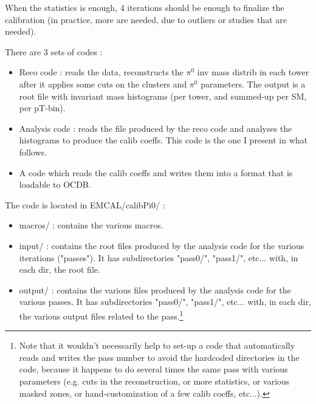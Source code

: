 When the statistics is enough, 4 iterations should be enough to finalize the calibration (in practice, more are needed, due to outliers or studies that are needed).

There are 3 sets of codes :
\begin{itemize}
\item  Reco code : reads the data, reconstructs the $\pi^{0}$ inv mass distrib in each tower after it applies some cuts on the clusters and $\pi^{0}$ parameters. The output is a root file with invariant mass histograms (per tower, and summed-up per SM, per pT-bin).
\item Analysis code : reads the file produced by the reco code and analyses the histograms to produce the calib coeffs. This code is the one I present in what follows.
\item A code which reads the calib coeffs and writes them into a format that is loadable to OCDB.
\end{itemize}
The code is located in EMCAL/calibPi0/ :
\begin{itemize}
\item macros/ : contains the various macros.
\item input/ : contains the root files produced by the analysis code for the various iterations ("passes"). It has subdirectories "pass0/", "pass1/", etc... with, in each dir, the root file.
\item output/ : contains the various files produced by the analysis code for the various passes. It has subdirectories "pass0/", "pass1/", etc... with, in each dir, the various output files related to the pass.\footnote{Note that it wouldn't necessarily help to set-up a code that automatically reads and writes the pass number to avoid the hardcoded directories in the code, because it happens to do several times the same pass with various parameters (e.g. cuts in the reconstruction, or more statistics, or various masked zones, or hand-customization of a few calib coeffs, etc...).}
\end{itemize}

